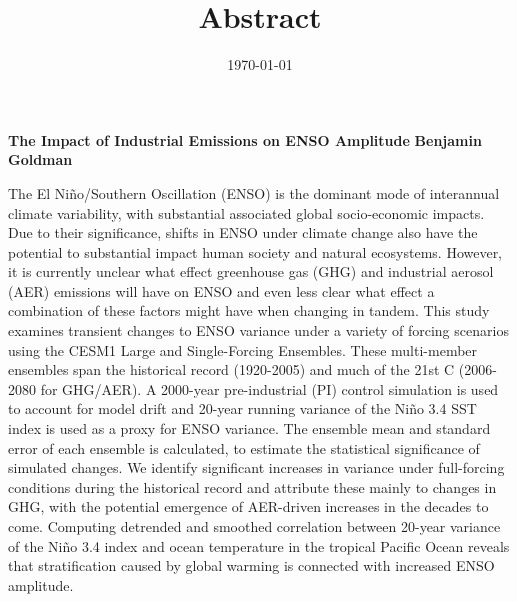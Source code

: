 \documentclass[11pt]{article}
\date{\today}
\title{Abstract}
\begin{document}
\begin{center}

{\bf The Impact of Industrial Emissions on ENSO Amplitude}
{\bf Benjamin Goldman}

\end{center}

The El Niño/Southern Oscillation (ENSO) is the dominant mode of interannual climate variability, with substantial associated global socio-economic impacts. Due to their significance, shifts in ENSO under climate change also have the potential to substantial impact human society and natural ecosystems. However, it is currently unclear what effect greenhouse gas (GHG) and industrial aerosol (AER) emissions will have on ENSO and even less clear what effect a combination of these factors might have when changing in tandem. This study examines transient changes to ENSO variance under a variety of forcing scenarios using the CESM1 Large and Single-Forcing Ensembles. These multi-member ensembles span the historical record (1920-2005) and much of the 21st C (2006-2080 for GHG/AER). A 2000-year pre-industrial (PI) control simulation is used to account for model drift and 20-year running variance of the Niño 3.4 SST index is used as a proxy for ENSO variance. The ensemble mean and standard error of each ensemble is calculated, to estimate the statistical significance of simulated changes. We identify significant increases in variance under full-forcing conditions during the historical record and attribute these mainly to changes in GHG, with the potential emergence of AER-driven increases in the decades to come. Computing detrended and smoothed correlation between 20-year variance of the Niño 3.4 index and ocean temperature in the tropical Pacific Ocean reveals that stratification caused by global warming is connected with increased ENSO amplitude.
\end{document}
